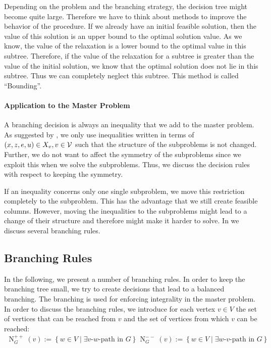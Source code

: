 Depending on the problem and the branching strategy, the decision tree might become quite large. Therefore we have to think about methods to improve the behavior of the procedure. If we already have an initial feasible solution, then the value of this solution is an upper bound to the optimal solution value. As we know, the value of the relaxation is a lower bound to the optimal value in this subtree. Therefore, if the value of the relaxation for a subtree is greater than the value of the initial solution, we know that the optimal solution does not lie in this subtree. Thus we can completely neglect this subtree. This method is called \enquote{Bounding}.

\paragraph{Application to the Master Problem} \parfill

A branching decision is always an inequality that we add to the master problem. As suggested by \cite{Kaiser}, we only use inequalities written in terms of ${(x,z,e,u)\in X_v}, {v\in\mathcal{V}}$ such that the structure of the subproblems is not changed. Further, we do not want to affect the symmetry of the subproblems since we exploit this when we solve the subproblems. Thus, we discuss the decision rules with respect to keeping the symmetry.

If an inequality concerns only one single subproblem, we move this restriction completely to the subproblem. This has the advantage that we still create feasible columns. However, moving the inequalities to the subproblems might lead to a change of their structure and therefore might make it harder to solve. In  we discuss several branching rules.


\subsection{Branching Rules}
\label{sec:branching_rules}

In the following, we present a number of branching rules. In order to keep the branching tree small, we try to create decisions that lead to a balanced branching. The branching is used for enforcing integrality in the master problem. In order to discuss the branching rules, we introduce for each vertex $v\in V$ the set of vertices that can be reached from $v$ and the set of vertices from which $v$ can be reached:  
\begin{align*}
	\operatorname{N}_G^{++}(v) := \left\{w\in V\mid\exists v \text{-} w \text{-path in } G\right\} && \operatorname{N}_G^{--}(v) := \left\{w\in V\mid\exists w \text{-} v \text{-path in } G\right\}
\end{align*}

